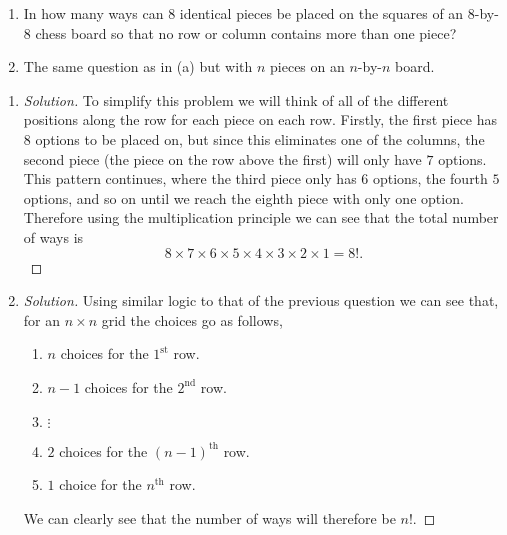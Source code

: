 \documentclass[10pt, a4paper]{article}
\begin{document}
\begin{problem}[Q12]\phantom{}
    \begin{enumerate}[label = (\alph*)]
        \item In how many ways can $8$ identical pieces be placed on the squares of an $8$-by-$8$ chess board so that no row or column contains more than one piece?
        \item The same question as in (a) but with $n$ pieces on an $n$-by-$n$ board.
    \end{enumerate}
    \begin{enumerate}[label = (\alph*)]
        \item 
        \begin{proof}[Solution]\renewcommand{\qedsymbol}{}
            To simplify this problem we will think of all of the different positions along the row for each piece on each row. Firstly, the first piece has $8$ options to be placed on, but since this eliminates one of the columns, the second piece (the piece on the row above the first) will only have $7$ options. This pattern continues, where the third piece only has $6$ options, the fourth $5$ options, and so on until we reach the eighth piece with only one option. Therefore using the multiplication principle we can see that the total number of ways is
            \[
            8 \times 7 \times 6 \times 5 \times 4 \times 3 \times 2 \times 1 = 8!.
            \]
        \end{proof}
        \item 
        \begin{proof}[Solution]\renewcommand{\qedsymbol}{}
            Using similar logic to that of the previous question we can see that, for an $n\times n$ grid the choices go as follows,
            \begin{enumerate}[label = {}]
                \item $n$ choices for the $1^{\text{st}}$ row.
                \item $n - 1$ choices for the $2^{\text{nd}}$ row.
                \item $\vdots$
                \item $2$ choices for the $(n - 1)^{\text{th}}$ row.
                \item $1$ choice for the $n^{\text{th}}$ row.
            \end{enumerate}
            We can clearly see that the number of ways will therefore be $n!$.
        \end{proof}
    \end{enumerate}
\end{problem}
\end{document}
